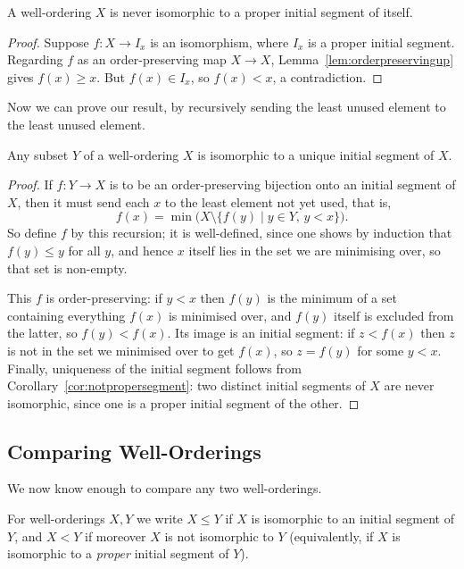 \documentclass[a4paper]{scrartcl}
\begin{document}
\begin{corollary}\label{cor:notpropersegment}
  A well-ordering $X$ is never isomorphic to a proper initial segment of itself.
\end{corollary}
\begin{proof}
  Suppose $f : X \to I_x$ is an isomorphism, where $I_x$ is a proper initial segment. Regarding $f$ as an order-preserving map $X \to X$, Lemma~\ref{lem:orderpreservingup} gives $f(x) \geq x$. But $f(x) \in I_x$, so $f(x) < x$, a contradiction.
\end{proof}

Now we can prove our result, by recursively sending the least unused element to the least unused element.

\begin{proposition}\label{prop:subsetcollapse}
  Any subset $Y$ of a well-ordering $X$ is isomorphic to a unique initial segment of $X$.
\end{proposition}
\begin{proof}
  If $f: Y \to X$ is to be an order-preserving bijection onto an initial segment of $X$, then it must send each $x$ to the least element not yet used, that is,
  $$f(x) = \min\bigl(X \setminus \{f(y) \mid y \in Y, \, y < x\}\bigr).$$
  So define $f$ by this recursion; it is well-defined, since one shows by induction that $f(y) \leq y$ for all $y$, and hence $x$ itself lies in the set we are minimising over, so that set is non-empty.

  This $f$ is order-preserving: if $y < x$ then $f(y)$ is the minimum of a set containing everything $f(x)$ is minimised over, and $f(y)$ itself is excluded from the latter, so $f(y) < f(x)$. Its image is an initial segment: if $z < f(x)$ then $z$ is not in the set we minimised over to get $f(x)$, so $z = f(y)$ for some $y < x$. Finally, uniqueness of the initial segment follows from Corollary~\ref{cor:notpropersegment}: two distinct initial segments of $X$ are never isomorphic, since one is a proper initial segment of the other.
\end{proof}

\subsection{Comparing Well-Orderings}

We now know enough to compare any two well-orderings.

\begin{definition}
  For well-orderings $X, Y$ we write $X \leq Y$ if $X$ is isomorphic to an initial segment of $Y$, and $X < Y$ if moreover $X$ is not isomorphic to $Y$ (equivalently, if $X$ is isomorphic to a \emph{proper} initial segment of $Y$).
\end{definition}
\end{document}
